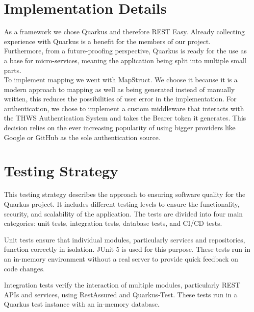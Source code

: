 \documentclass[a4paper, 11pt]{article}
\begin{document}
    \section{Implementation Details}\label{sec:implementation-details}
As a framework we chose Quarkus and therefore REST Easy. Already collecting experience with Quarkus is a benefit for the members of our project. Furthermore, from a future-proofing perspective, Quarkus is ready for the use as a base for micro-services, meaning the application being split into multiple small parts.\\
To implement mapping we went with MapStruct. We choose it because it is a modern approach to mapping as well as being generated instead of manually written, this reduces the possibilities of user error in the implementation.
For authentication, we chose to implement a custom middleware that interacts with the THWS Authentication System and takes the Bearer token it generates. This decision relies on the ever increasing popularity of using bigger providers like Google or GitHub as the sole authentication source.



    \section{Testing Strategy}\label{sec:testing-strategy}
This testing strategy describes the approach to ensuring software quality for the Quarkus project. It includes different testing levels to ensure the functionality, security, and scalability of the application. The tests are divided into four main categories: unit tests, integration tests, database tests, and CI/CD tests.

Unit tests ensure that individual modules, particularly services and repositories, function correctly in isolation. JUnit 5 is used for this purpose. These tests run in an in-memory environment without a real server to provide quick feedback on code changes.

Integration tests verify the interaction of multiple modules, particularly REST APIs and services, using RestAssured and Quarkus-Test. These tests run in a Quarkus test instance with an in-memory database.
\end{document}
